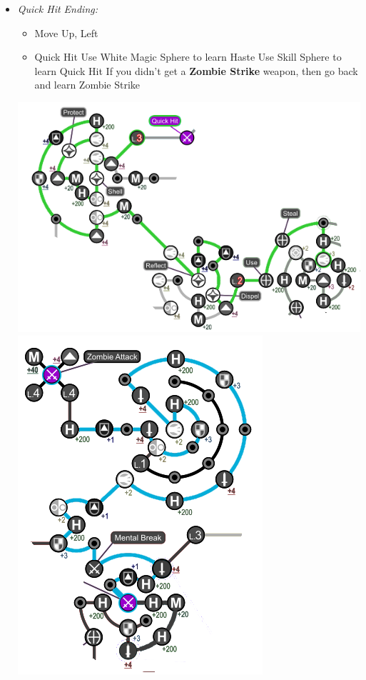 \begin{spheregrid}
\begin{multicols}{2}
\begin{itemize}
            \columnbreak
      \item \textit{Quick Hit Ending:}
            \begin{itemize}
              \rikkuf Unlock Level 2 Key Sphere
              \item Move Up, Left
              \item Quick Hit
                    \yunaf Use White Magic Sphere to learn Haste
                    \yunaf Use Skill Sphere to learn Quick Hit
                    \tidusf If you didn't get a \textbf{Zombie Strike} weapon, then go back and learn Zombie Strike
            \end{itemize}
            \includegraphics[width=.9\columnwidth]{graphics/Quick_hit}
            \includegraphics[width=.6\columnwidth]{graphics/Tidus_zombie}
    \end{itemize}
  \end{multicols}
\end{spheregrid}
